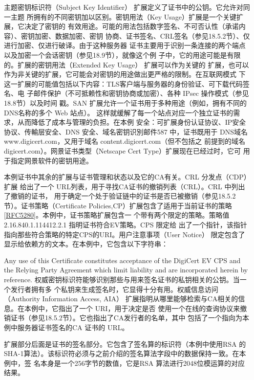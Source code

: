 主题密钥标识符（Subject Key Identifier） 扩展定义了证书中的公钥。它允许对同一主题
所拥有的不同密钥加以区别。密钥用法（Key Usage）扩展是一个关键扩展，它决定了密钥的
有效用途。可能的用法包括数字签名、不可否认性（承诺内容）、密钥加密、数据加密、密钥
协商、证书签名、CRL签名（参见18.5.2节）、仅进行加密、仅进行破译。由于这种服务器
证书主要用于识别一条连接的两个端点以及加密一个会话密钥（参见18.9节），就像这个例
子中，它的用途可能是有限的。扩展的密钥用法（Extended Key Usage） 扩展可以作为关键的
扩展，也可以作为非关键的扩展，它可能会对密钥的用途做出更严格的限制。在互联网模式
下这一扩展的可能值包括以下内容：TLS客户端与服务器的身份验证、可下载代码签名、电
子邮件保护（不可抵赖性和密钥协商或加密）、各种 IPsec 操作模式（参见18.8节）以及时间
戳。SAN 扩展允许一个证书用于多种用途（例如，拥有不同的DNS名称的多个 Web 站点）。
这样就缓解了每一个站点对应一个独立证书的需求，从而降低了成本与管理的负担。在本例
安全：可扩展身份认证协议、IP安全协议、传輸层安全、DNS 安全、域名密钥识別邮件587
中，证书既用于 DNS域名 www.digicert.com，又用于域名 content.digicert.com（但不包括之
前提到的域名 digicert.com）。网景证书类型（Netscape Cert Type）扩展现在已经过时，它可
用于指定网景软件的密钥用途。

本例证书中其余的扩展与证书管理和状态以及它的CA有关。CRL 分发点（CDP）扩展
给出了一个 URL列表，用于寻找CA证书的撤销列表（CRL）。CRL 中列出了撤销的证书，
用于确定一个处于验证链中的证书是否已被撤销（参见18.5.2节）。证书策略（Certificate
Policies,CP）扩展包含了适用于当前证书的策略\href{https://www.rfc-editor.org/rfc/rfc5280}{[RFC5280]}。本例中，证书策略扩展包含一
个带有两个限定的策略。策略值2.16.840.1.114412.2.1 指明证书符合EV策略。CPS 限定给
出了一个指针，该指针指向那些符合策略的特定CPS的URI。用户注意事项（User Notice）
限定包含了显示给依赖方的文本。在本例中，它包含以下字符串：

Any use of this Certificate constitutes acceptance of the DigiCert EV CPS and the Relying
Party Agreement which limit liability and are incorporated herein by reference.
权威密钥标识符能够识别那些与用来签名证书的私钥相关的公钥。当一个发行者拥有多
个私钥来生成签名时，它显得十分有用。权威信息访问（Authority Information Access, AIA）
扩展指明从哪里能够检索与CA相关的信息。在本例中，它指出了一个 URI，用于决定是否
使用一个在线的查询协议来撤销证书（参见18.5.2节）。它也指出了CA发行者的名单，其中
包括了一个指向为本例中服务器证书签名的CA 证书的 URL。

扩展部分后面是证书的签名部分。它包含了签名算的标识符（本例中使用RSA 的
SHA-1算法）。该标识符必须与之前介绍的签名算法字段中的数据保持一致。在本例中，签
名本身是一个256字节的数值，它是RSA 算法进行2048位模运算的对应结果。

